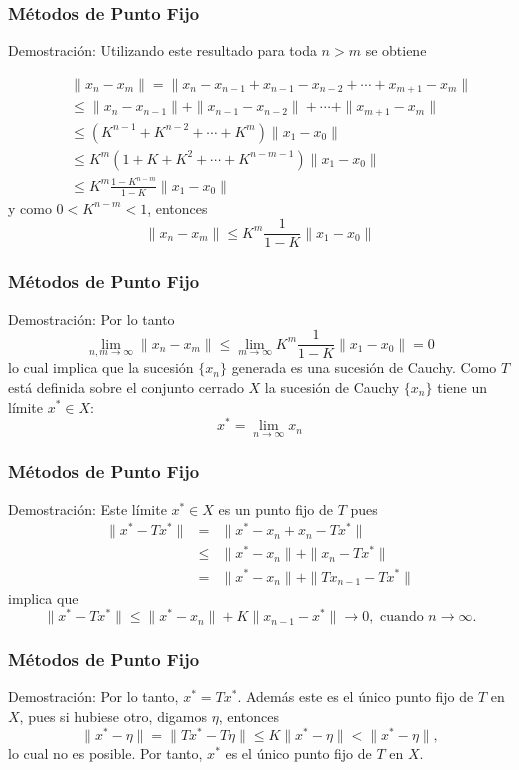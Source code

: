 \documentclass{beamer}
\begin{document}
\begin{frame}
  \frametitle{M\'etodos de Punto Fijo}
  \begin{block}{Demostraci\'on:}
    Utilizando este resultado para toda $n > m$ se obtiene

\begin{eqnarray}
 \nonumber & & \|x_n - x_m\|  =   \|x_n - x_{n-1} + x_{n-1} - x_{n-2} + \cdots + x_{m+1} - x_m\|\\
 \nonumber & & \leq \|x_n - x_{n-1}\| + \|x_{n-1} - x_{n-2}\| + \cdots + \|x_{m+1} - x_m\|\\
 \nonumber & & \leq (K^{n-1} + K^{n-2} + \cdots + K^m)\|x_1 - x_0\|\\
 \nonumber & & \leq K^m(1 + K + K^2 + \cdots + K^{n-m-1})\|x_1 - x_0\|\\
 \nonumber & & \leq K^m\frac{1-K^{n-m}}{1-K}\|x_1 - x_0\|
\end{eqnarray}
y como $0 < K^{n-m} < 1$, entonces
$$
\|x_n - x_m\| \leq K^m\frac{1}{1-K}\|x_1 - x_0\|
$$
\end{block}
\end{frame}
\begin{frame}
  \frametitle{M\'etodos de Punto Fijo}
  \begin{block}{Demostraci\'on:}
    Por lo tanto
$$
\lim_{n,m \to \infty} \|x_n - x_m\| \leq \lim_{m \to \infty}K^m\frac{1}{1-K}\|x_1 - x_0\|=0
$$
lo cual implica que la sucesi\'on $\{x_n\}$ generada es una sucesi\'on de Cauchy. Como $T$ est\'a
definida sobre el conjunto cerrado $X$ la sucesi\'on de Cauchy $\{x_n\}$ tiene un l\'imite $x^* \in X$:
$$
x^* = \lim_{n \to \infty}x_n
$$
\end{block}
\end{frame}
\begin{frame}
  \frametitle{M\'etodos de Punto Fijo}
  \begin{block}{Demostraci\'on:}
Este l\'imite $x^* \in X$ es un punto fijo de $T$ pues
\begin{eqnarray}
\nonumber  \|x^* - T x^*\| & = & \|x^* - x_n + x_n - T x^*\| \\
\nonumber & \leq & \|x^* - x_n\| + \|x_n - T x^*\| \\
\nonumber & = & \|x^* - x_n\| + \|T x_{n-1} - Tx^*\|
\end{eqnarray}
implica que
$$
  \|x^* - Tx^*\| \leq  \|x^* - x_n\| + K \|x_{n-1} - x^*\| \to 0,\mbox{ cuando } n \to \infty.
$$
\end{block}
\end{frame}
\begin{frame}
  \frametitle{M\'etodos de Punto Fijo}
  \begin{block}{Demostraci\'on:}
    Por lo tanto, $x^* = T x^*$. Adem\'as este es el \'unico punto fijo de $T$ en $X$, pues si hubiese otro, digamos $\eta$,
entonces
$$
\|x^* - \eta\| = \|Tx^* - T\eta\| \leq K \|x^* - \eta\| < \|x^* - \eta\|,
$$
lo cual no es posible. Por tanto, $x^*$ es el \'unico punto fijo de $T$ en $X$.
  \end{block}
\end{frame} 
\end{document}
